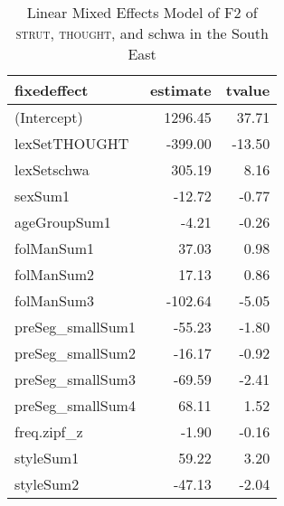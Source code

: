\begin{table}[ht]
\centering
\begin{tabular}{lrr}
  \hline
fixedeffect & estimate & tvalue \\ 
  \hline
(Intercept) & 1296.45 & 37.71 \\ 
  lexSetTHOUGHT & -399.00 & -13.50 \\ 
  lexSetschwa & 305.19 & 8.16 \\ 
  sexSum1 & -12.72 & -0.77 \\ 
  ageGroupSum1 & -4.21 & -0.26 \\ 
  folManSum1 & 37.03 & 0.98 \\ 
  folManSum2 & 17.13 & 0.86 \\ 
  folManSum3 & -102.64 & -5.05 \\ 
  preSeg\_smallSum1 & -55.23 & -1.80 \\ 
  preSeg\_smallSum2 & -16.17 & -0.92 \\ 
  preSeg\_smallSum3 & -69.59 & -2.41 \\ 
  preSeg\_smallSum4 & 68.11 & 1.52 \\ 
  freq.zipf\_z & -1.90 & -0.16 \\ 
  styleSum1 & 59.22 & 3.20 \\ 
  styleSum2 & -47.13 & -2.04 \\ 
   \hline
\end{tabular}
\caption{Linear Mixed Effects Model of F2 of \textsc{strut}, \textsc{thought}, and schwa in the South East \label{tbl:FSF2SE}} 
\end{table}
